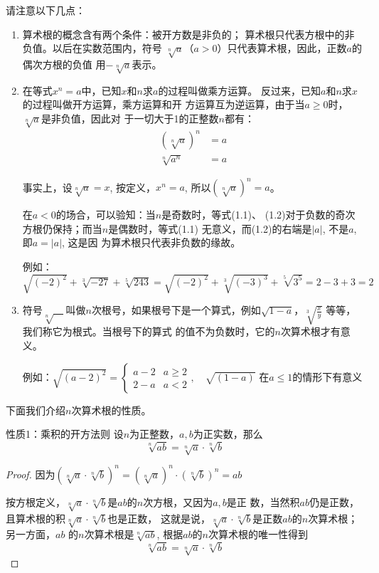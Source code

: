 请注意以下几点：

\begin{enumerate}
    \item 算术根的概念含有两个条件：被开方数是非负的；
算术根只代表方根中的非负值。以后在实数范围内，符号
$\sqrt[n]{a}$（$a>0$）只代表算术根，因此，正数$a$的偶次方根的负值
用$-\sqrt[n]{a}$表示。
\item 在等式$x^n=a$中，已知$x$和$n$求$a$的过程叫做乘方运算。
反过来，已知$a$和$n$求$x$的过程叫做开方运算，乘方运算和开
方运算互为逆运算，由于当$a\ge 0$时，$\sqrt[n]{a}$是非负值，因此对
于一切大于1的正整数$n$都有：
\begin{align}
    \left(\sqrt[n]{a}\right)^n&=a\\
    \sqrt[n]{a^n}&=a
\end{align}

事实上，设$\sqrt[n]{a}=x$, 按定义，$x^n=a$, 所以$\left(\sqrt[n]{a}\right)^n=a$。

在$a<0$的场合，可以验知：当$n$是奇数时，等式(1.1)、
(1.2)对于负数的奇次方根仍保持；而当$n$是偶数时，等式(1.1)
无意义，而(1.2)的右端是$|a|$, 不是$a$, 即$a=|a|$, 这是因
为算术根只代表非负数的缘故。

例如：$\sqrt{(-2)^2}+\sqrt[3]{-27}+\sqrt[5]{243}=\sqrt{(-2)^2}+\sqrt[3]{(-3)^3}+\sqrt[5]{3^5}=2-3+3=2$

\item 符号$\sqrt[n]{\quad }$叫做$n$次根号，如果根号下是一个算式，例如$\sqrt{1-a}$，$\sqrt[3]{\frac{x}{y}}$
等等，我们称它为根式。当根号下的算式
的值不为负数时，它的$n$次算术根才有意义。

例如：$\sqrt{(a-2)^2}=\begin{cases}
    a-2 & a\ge 2\\
    2-a & a<2
\end{cases},\quad \sqrt{(1-a)} \text{ 在$a\le 1$的情形下有意义}$

\end{enumerate}

下面我们介绍$n$次算术根的性质。

\begin{blk}{性质1：乘积的开方法则}
设$n$为正整数，$a,b$为正实数，那么
$$\sqrt[n]{ab}=\sqrt[n]{a}\cdot \sqrt[n]{b}$$
\end{blk}

\begin{proof}
    因为$\left(\sqrt[n]{a}\cdot \sqrt[n]{b}\right)^n=\left(\sqrt[n]{a}\right)^n\cdot \left(\sqrt[n]{b}\right)^n=ab$
    
    按方根定义，$\sqrt[n]{a}\cdot \sqrt[n]{b}$是$ab$的$n$次方根，又因为$a,b$是正
    数，当然积$ab$仍是正数，且算术根的积$\sqrt[n]{a}\cdot \sqrt[n]{b}$也是正数，
    这就是说，$\sqrt[n]{a}\cdot \sqrt[n]{b}$是正数$ab$的$n$次算术根；另一方面，$ab$
    的$n$次算术根是$\sqrt[n]{ab}$, 根据$ab$的$n$次算术根的唯一性得到
    $$\sqrt[n]{ab}=\sqrt[n]{a}\cdot \sqrt[n]{b}$$
\end{proof}

